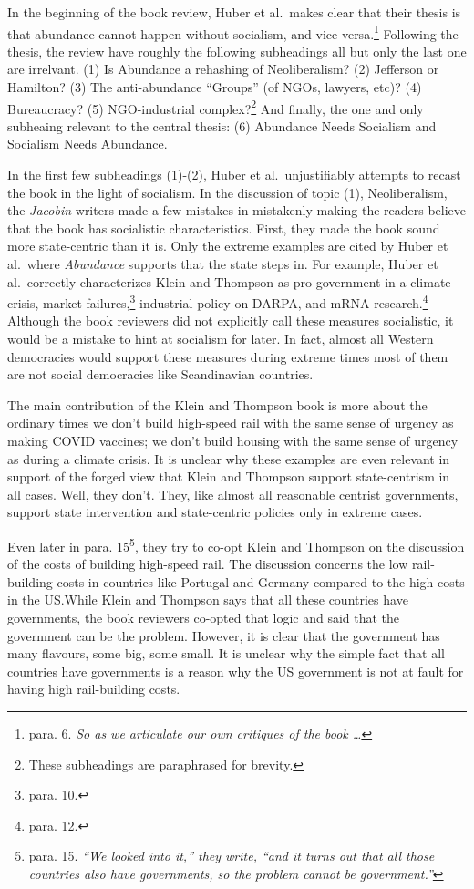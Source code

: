 \documentclass[12pt]{article}
\begin{document}
In the beginning of the book review, Huber et al.\ makes clear that their thesis is that abundance cannot happen without socialism, and vice versa.\footnote{para. 6. \textit{So as we articulate our own critiques of the book \dots}} Following the thesis, the review have roughly the following subheadings\textemdash{} all but only the last one are irrelvant. (1) Is Abundance a rehashing of Neoliberalism? (2) Jefferson or Hamilton? (3) The anti-abundance ``Groups'' (of NGOs, lawyers, etc)? (4) Bureaucracy? (5) NGO-industrial complex?\footnote{These subheadings are paraphrased for brevity.} And finally, the one and only  subheaing relevant to the central thesis: (6) Abundance Needs Socialism and Socialism Needs Abundance.

In the first few subheadings (1)-(2), Huber et al.\ unjustifiably attempts to recast the book in the light of socialism. In the discussion of topic (1), Neoliberalism, the \textit{Jacobin} writers made a few mistakes in mistakenly making the readers believe that the book has socialistic characteristics. First, they made the book sound more state-centric than it is. Only the extreme examples are cited by Huber et al.\ where \textit{Abundance} supports that the state steps in. For example, Huber et al.\ correctly characterizes Klein and Thompson as pro-government in a climate crisis, market failures,\footnote{para. 10.} industrial policy on DARPA, and mRNA research.\footnote{para. 12.} Although the book reviewers did not explicitly call these measures socialistic, it would be a mistake to hint at socialism for later. In fact, almost all Western democracies would support these measures during extreme times\textemdash{} most of them are not social democracies like Scandinavian countries. 

The main contribution of the Klein and Thompson book is more about the ordinary times\textemdash{} we don't build high-speed rail with the same sense of urgency as making COVID vaccines; we don't build housing with the same sense of urgency as during a climate crisis. It is unclear why these examples are even relevant in support of the forged view that Klein and Thompson support state-centrism in all cases. Well, they don't. They, like almost all reasonable centrist governments, support state intervention and state-centric policies only in extreme cases.

Even later in para. 15\footnote{para. 15. \textit{``We looked into it,'' they write, ``and it turns out that all those countries also have governments, so the problem cannot be government.''}}, they try to co-opt Klein and Thompson on the discussion of the costs of building high-speed rail. The discussion concerns the low rail-building costs in countries like Portugal and Germany compared to the high costs in the US.\@ While Klein and Thompson says that all these countries have governments, the book reviewers co-opted that logic and said that the government can be the problem. However, it is clear that the government has many flavours, some big, some small. It is unclear why the simple fact that all countries have governments is a reason why the US government is not at fault for having high rail-building costs.
\end{document}
